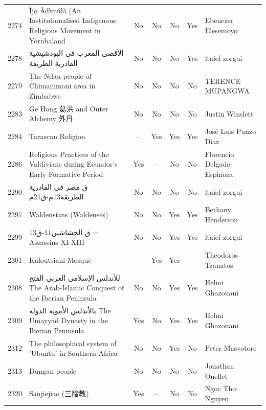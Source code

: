 {\begin{longtable}{rp{3.5cm}ccccp{3cm}}
2274 & {\raggedright Ìjọ Àdìmúlà (An Institutionalised Indigenous Religious Movement in Yorubaland} & No & No & No & Yes & {\raggedright Ebenezer Elesemoyo} \\
2278 & {\raggedright {\arabicfont الأقصى المغرب في البودشيشية القادرية الطريقة}} & No & No & No & Yes & {\raggedright ltaief zorgui} \\
2279 & {\raggedright The Ndau people of Chimanimani area in Zimbabwe} & No & No & No & No & {\raggedright TERENCE MUPANGWA} \\
2283 & {\raggedright Ge Hong 葛洪 and Outer Alchemy 外丹} & No & No & No & No & {\raggedright Justin Winslett} \\
2284 & {\raggedright Tarascan Religion} & -- & Yes & Yes & Yes & {\raggedright José Luis Punzo Díaz} \\
2286 & {\raggedright Religious Practices of the Valdivians during Ecuador's Early Formative Period} & Yes & -- & No & No & {\raggedright Florencio Delgado-Espinoza} \\
2290 & {\raggedright {\arabicfont ق مصر في القادرية الطريقة}13{\arabicfont م}-{\arabicfont ق}21{\arabicfont م}} & No & No & No & No & {\raggedright ltaief zorgui} \\
2297 & {\raggedright Waldensians (Waldenses)} & No & No & Yes & Yes & {\raggedright Bethany Henderson} \\
2299 & {\raggedright {\arabicfont ق  الحشاشين}11-{\arabicfont ق}13   =   Assassins   XI-XIII} & No & No & Yes & Yes & {\raggedright ltaief zorgui} \\
2301 & {\raggedright Kaloutsiani Mosque} & -- & Yes & Yes & -- & {\raggedright Theodoros Tzanatos} \\
2308 & {\raggedright {\arabicfont للأندلس الإسلامي العربي الفتح} The Arab-Islamic Conquest of the Iberian Peninsula} & No & No & Yes & Yes & {\raggedright Helmi Ghazouani} \\
2309 & {\raggedright {\arabicfont بالأندلس الأموية الدولة} The Umayyad Dynasty in the Iberian Peninsula} & Yes & No & Yes & Yes & {\raggedright Helmi Ghazouani} \\
2312 & {\raggedright The philosophical system of 'Ubuntu' in Southern Africa} & No & No & Yes & No & {\raggedright Peter Masvotore} \\
2313 & {\raggedright Dungan people} & No & No & No & No & {\raggedright Jonathan Ouellet} \\
2320 & {\raggedright Sanjiejiao (三階教)} & Yes & -- & No & No & {\raggedright Ngoc Tho Nguyen} \\

\end{longtable}}
